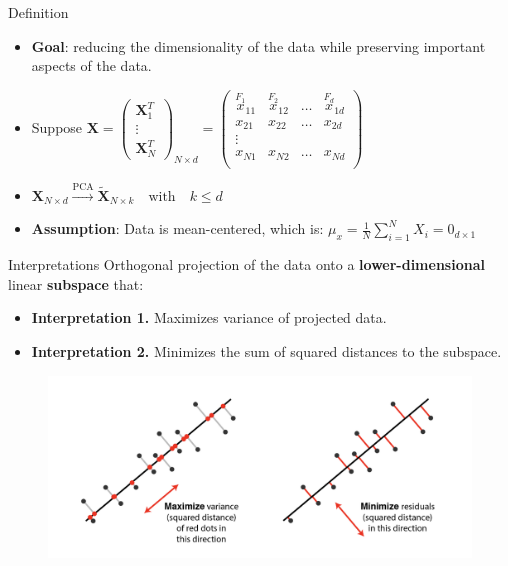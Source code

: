 \documentclass[serif, aspectratio=169]{beamer}
\begin{document}
\begin{frame}{Definition}
    \begin{itemize}
        \item \textbf{Goal}: reducing the dimensionality of the data while preserving important aspects of the data.
        \item Suppose $\mathbf{X} = \begin{pmatrix} \mathbf{X}_1^T \\ \vdots \\ \mathbf{X}_N^T \end{pmatrix}_{N \times d} = \begin{pmatrix}  
\overset{\displaystyle F_1}x_{11} & \overset{\displaystyle F_2}x_{12} & \hdots & \overset{\displaystyle F_d}x_{1d} \\
x_{21} & x_{22} & \hdots & x_{2d} \\
\vdots \\
x_{N1} & x_{N2} & \hdots & x_{Nd} \\
\end{pmatrix} $
        \item $\mathbf{X}_{N \times d} \xrightarrow{\text{PCA}} \tilde{\mathbf{X}}_{N \times k} \quad \text{with} \quad k \leq d$
        \item \textbf{Assumption}: Data is mean-centered, which is: $\mu_x = \frac{1}{N} \sum_{i=1}^{N}X_i = 0_{d \times 1}$
    \end{itemize}
\end{frame}

\begin{frame}{Interpretations}
    Orthogonal projection of the data onto a \textbf{lower-dimensional} linear \textbf{subspace} that:
    \begin{itemize}
        \item \textbf{Interpretation 1.} Maximizes variance of projected data.
        \item \textbf{Interpretation 2.} Minimizes the sum of squared distances to the subspace.
    \end{itemize}
    \begin{figure}[htpb]
        \begin{center}
            \includegraphics[keepaspectratio, scale=0.4]{pic/pca.png}
        \end{center}
    \end{figure}
\end{frame}
\end{document}
